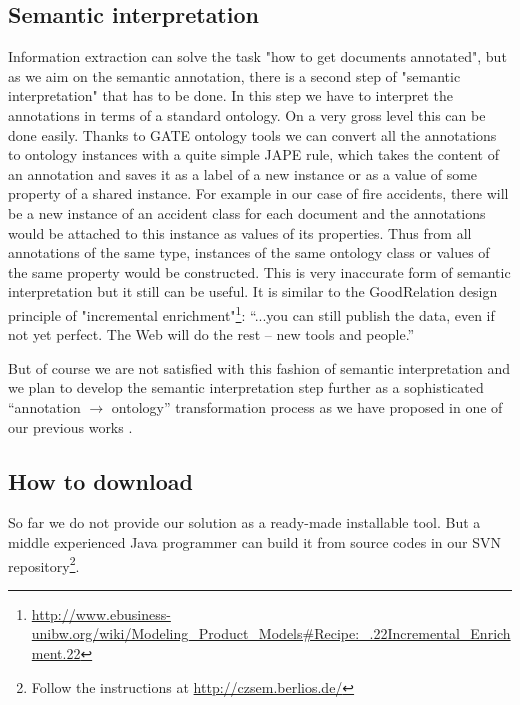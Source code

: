 \documentclass[runningheads,a4paper]{llncs}
\begin{document}
\subsection{Semantic interpretation}
\label{sec:SemanticInterpretation}
Information extraction can solve the task "how to get documents annotated", but as we aim on the semantic annotation, there is a second step of "semantic interpretation" that has to be done. In this step we have to interpret the annotations in terms of a standard ontology. On a very gross level this can be done easily. Thanks to GATE ontology tools \cite{Bon04b} we can convert all the annotations to ontology instances with a quite simple JAPE \cite{Cunningham00jape:a} rule, which takes the content of an annotation and saves it as a label of a new instance or as a value of some property of a shared instance. For example in our case of fire accidents, there will be a new instance of an accident class for each document and the annotations would be attached to this instance as values of its properties. Thus from all annotations of the same type, instances of the same ontology class or values of the same property would be constructed. This is very inaccurate form of semantic interpretation but it still can be useful. It is similar to the GoodRelation \cite{DBLP:conf/ekaw/Hepp08} design principle of "incremental enrichment"\footnote{\url{http://www.ebusiness-unibw.org/wiki/Modeling_Product_Models#Recipe:_.22Incremental_Enrichment.22}}:
``...you can still publish the data, even if not yet perfect. The Web will do the rest -- new tools and people.''	

But of course we are not satisfied with this fashion of semantic interpretation and we plan to develop the semantic interpretation step further as a sophisticated ``annotation $\rightarrow$ ontology'' transformation process as we have proposed in one of our previous works \cite{biblio:DeVoComputingaggregations2008}.

\subsection{How to download}
So far we do not provide our solution as a ready-made installable tool. But a middle experienced Java programmer can build it from source codes in our SVN repository\footnote{Follow the instructions at \url{http://czsem.berlios.de/}}.
\end{document}
